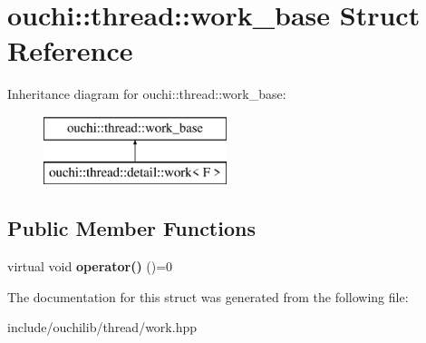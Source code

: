 \hypertarget{structouchi_1_1thread_1_1work__base}{}\section{ouchi\+::thread\+::work\+\_\+base Struct Reference}
\label{structouchi_1_1thread_1_1work__base}
Inheritance diagram for ouchi\+::thread\+::work\+\_\+base\+:\begin{figure}[H]
\begin{center}
\leavevmode
\includegraphics[height=2.000000cm]{structouchi_1_1thread_1_1work__base}
\end{center}
\end{figure}
\subsection*{Public Member Functions}
\begin{DoxyCompactItemize}
\item 
\mbox{\label{structouchi_1_1thread_1_1work__base_a000d1c7b7f18f3d850120c2f559af943}} 
virtual void {\bfseries operator()} ()=0
\end{DoxyCompactItemize}


The documentation for this struct was generated from the following file\+:\begin{DoxyCompactItemize}
\item 
include/ouchilib/thread/work.\+hpp\end{DoxyCompactItemize}
